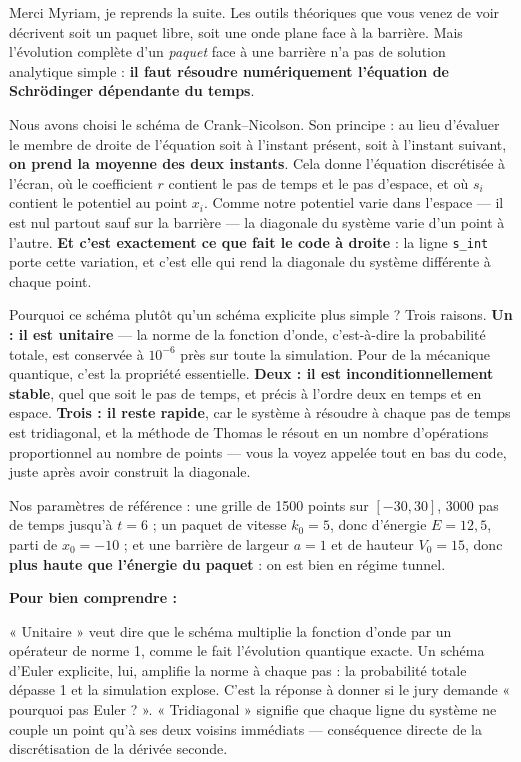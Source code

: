 \documentclass[11pt,a4paper]{article}
\newenvironment{comprendre}%
{\par\medskip\noindent\hrulefill\par\nopagebreak\textbf{Pour bien comprendre :}\itshape\par}%
{\par\nopagebreak\noindent\hrulefill\par\medskip}
\begin{document}
	Merci Myriam, je reprends la suite. Les outils théoriques que vous venez de
	voir décrivent soit un paquet libre, soit une onde plane face à la barrière. Mais l'évolution complète
	d'un \emph{paquet} face à une barrière n'a pas de solution analytique simple :
	\textbf{il faut résoudre numériquement l'équation de Schrödinger dépendante du
		temps}.
	
	Nous avons choisi le schéma de Crank--Nicolson. Son principe : au lieu d'évaluer
	le membre de droite de l'équation soit à l'instant présent, soit à l'instant
	suivant, \textbf{on prend la moyenne des deux instants}. Cela donne l'équation
	discrétisée à l'écran, où le coefficient $r$ contient le pas de temps et le pas
	d'espace, et où $s_i$ contient le potentiel au point $x_i$. Comme notre potentiel
	varie dans l'espace --- il est nul partout sauf sur la barrière --- la diagonale
	du système varie d'un point à l'autre. \textbf{Et c'est exactement ce que fait
		le code à droite} : la ligne \texttt{s\_int} porte cette variation, et c'est
	elle qui rend la diagonale du système différente à chaque point.
	
	Pourquoi ce schéma plutôt qu'un schéma explicite plus simple ? Trois raisons.
	\textbf{Un : il est unitaire} --- la norme de la fonction d'onde, c'est-à-dire la
	probabilité totale, est conservée à $10^{-6}$ près sur toute la simulation. Pour
	de la mécanique quantique, c'est la propriété essentielle. \textbf{Deux : il est
		inconditionnellement stable}, quel que soit le pas de temps, et précis à l'ordre
	deux en temps et en espace. \textbf{Trois : il reste rapide}, car le système à
	résoudre à chaque pas de temps est tridiagonal, et la méthode de Thomas le résout
	en un nombre d'opérations proportionnel au nombre de points --- vous la voyez
	appelée tout en bas du code, juste après avoir construit la diagonale.
	
	Nos paramètres de référence : une grille de 1500 points sur $[-30, 30]$, 3000 pas
	de temps jusqu'à $t = 6$ ; un paquet de vitesse $k_0 = 5$, donc d'énergie
	$E = 12{,}5$, parti de $x_0 = -10$ ; et une barrière de largeur $a = 1$ et de
	hauteur $V_0 = 15$, donc \textbf{plus haute que l'énergie du paquet} : on est
	bien en régime tunnel.
	
	\begin{comprendre}
		« Unitaire » veut dire que le schéma multiplie la fonction d'onde par un
		opérateur de norme 1, comme le fait l'évolution quantique exacte. Un schéma
		d'Euler explicite, lui, amplifie la norme à chaque pas : la probabilité totale
		dépasse 1 et la simulation explose. C'est la réponse à donner si le jury demande
		« pourquoi pas Euler ? ». « Tridiagonal » signifie que chaque ligne du système ne
		couple un point qu'à ses deux voisins immédiats --- conséquence directe de la
		discrétisation de la dérivée seconde.
	\end{comprendre}
	
\end{document}
